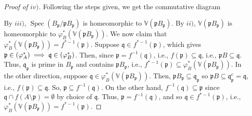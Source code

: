 \documentclass[12pt,letterpaper]{article}
\theoremstyle{definition}
\theoremstyle{remark}
\numberwithin{figure}{problem}
\numberwithin{equation}{section}
\let\Im\relax
\DeclareMathOperator{\Im}{Im}
\DeclareMathOperator{\Spec}{Spec}
\begin{document}
\begin{proof}[Proof of $iv)$]
  Following the steps given, we get the commutative diagram
  \begin{center}
  \end{center}
  By $iii)$, $\Spec(B_\mathfrak{p}/\mathfrak{p}B_\mathfrak{p})$ is homeomorphic to $\mathbb{V}(\mathfrak{p}B_\mathfrak{p})$. By $ii)$, $\mathbb{V}(\mathfrak{p}B_\mathfrak{p})$ is homeomorphic to $\varphi_B^*(\mathbb{V}(\mathfrak{p}B_\mathfrak{p}))$. We now claim that $\varphi_B^*(\mathbb{V}(\mathfrak{p}B_\mathfrak{p})) = f^{*-1}(\mathfrak{p})$. Suppose $\mathfrak{q} \in f^{*-1}(\mathfrak{p})$, which gives $\mathfrak{p} \in \Im(\varphi_A^*) \implies \mathfrak{q} \in \Im(\varphi_B^*)$. Then, since $\mathfrak{p} = f^{-1}(\mathfrak{q})$, i.e., $f(\mathfrak{p}) \subseteq \mathfrak{q}$, i.e., $\mathfrak{p}B \subseteq \mathfrak{q}$. Thus, $\mathfrak{q}_\mathfrak{p}$ is prime in $B_\mathfrak{p}$ and contains $\mathfrak{p}B_\mathfrak{p}$, i.e., $f^{*-1}(\mathfrak{p}) \subseteq \varphi_B^*(\mathbb{V}(\mathfrak{p}B_\mathfrak{p}))$. In the other direction, suppose $\mathfrak{q} \in \varphi_B^*(\mathbb{V}(\mathfrak{p}B_\mathfrak{p}))$. Then, $\mathfrak{p}B_\mathfrak{p} \subseteq \mathfrak{q}_\mathfrak{p}$ so $\mathfrak{p}B \subseteq \mathfrak{q}_\mathfrak{p}^c = \mathfrak{q}$, i.e., $f(\mathfrak{p}) \subseteq \mathfrak{q}$. So, $\mathfrak{p} \subseteq f^{-1}(\mathfrak{q})$. On the other hand, $f^{-1}(\mathfrak{q}) \subseteq \mathfrak{p}$ since $\mathfrak{q} \cap f(A \setminus \mathfrak{p}) = \emptyset$ by choice of $\mathfrak{q}$. Thus, $\mathfrak{p} = f^{-1}(\mathfrak{q})$, and so $\mathfrak{q} \in f^{*-1}(\mathfrak{p})$, i.e., $\varphi_B^*(\mathbb{V}(\mathfrak{p}B_\mathfrak{p})) = f^{*-1}(\mathfrak{p})$.

\end{proof}
\end{document}
